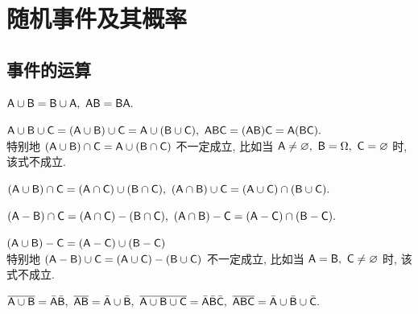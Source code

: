\section{随机事件及其概率}

\subsection{事件的运算}

\begin{theorem}[交换律]
    $\mathsf{A} \cup \mathsf{B}=\mathsf{B} \cup \mathsf{A},~\mathsf{A} \mathsf{B}=\mathsf{B} \mathsf{A} .$
\end{theorem}

\begin{theorem}[结合律]
    $\mathsf{A} \cup \mathsf{B} \cup \mathsf{C}=(\mathsf{A} \cup \mathsf{B}) \cup \mathsf{C}=\mathsf{A} \cup(\mathsf{B} \cup \mathsf{C}),~\mathsf{A} \mathsf{B} \mathsf{C}=(\mathsf{A} \mathsf{B}) \mathsf{C}=\mathsf{A}(\mathsf{B} \mathsf{C}) .$\\
    特别地 $(\mathsf{A} \cup \mathsf{B}) \cap \mathsf{C}=\mathsf{A} \cup(\mathsf{B} \cap \mathsf{C})$ 不一定成立, 比如当 $ \mathsf{A} \neq \varnothing,~\mathsf{B}=\Omega,~\mathsf{C}=\varnothing $ 时, 该式不成立.
\end{theorem}

\begin{theorem}[和与积的分配律]
    $(\mathsf{A} \cup \mathsf{B}) \cap \mathsf{C}=(\mathsf{A} \cap \mathsf{C}) \cup(\mathsf{B} \cap \mathsf{C}),~(\mathsf{A} \cap \mathsf{B}) \cup \mathsf{C}=(\mathsf{A} \cup \mathsf{C}) \cap(\mathsf{B} \cup \mathsf{C}) .$
\end{theorem}

\begin{theorem}[差与积的分配律]
    $(\mathsf{A}-\mathsf{B}) \cap \mathsf{C}=(\mathsf{A} \cap \mathsf{C})-(\mathsf{B} \cap \mathsf{C}),~(\mathsf{A} \cap \mathsf{B})-\mathsf{C}=(\mathsf{A}-\mathsf{C}) \cap(\mathsf{B}-\mathsf{C}) .$
\end{theorem}

\begin{theorem}[和与差的分配律]
    $(\mathsf{A} \cup \mathsf{B})-\mathsf{C}=(\mathsf{A}-\mathsf{C}) \cup(\mathsf{B}-\mathsf{C})$\\
    特别地 $(\mathsf{A}-\mathsf{B}) \cup \mathsf{C}=(\mathsf{A} \cup \mathsf{C})-(\mathsf{B} \cup \mathsf{C})$ 不一定成立, 比如当 $ \mathsf{A}=\mathsf{B},~\mathsf{C} \neq \varnothing $ 时, 该式不成立.
\end{theorem}

\begin{theorem}[对偶律]
    $\overline{\mathsf{A} \cup \mathsf{B}}=\bar{\mathsf{A}} \bar{\mathsf{B}},~\overline{\mathsf{A} \mathsf{B}}=\bar{\mathsf{A}} \cup \bar{\mathsf{B}},~\overline{\mathsf{A} \cup \mathsf{B} \cup \mathsf{C}}=\bar{\mathsf{A}} \bar{\mathsf{B}} \bar{\mathsf{C}},~\overline{\mathsf{A} \mathsf{B} \mathsf{C}}=\bar{\mathsf{A}} \cup \bar{\mathsf{B}} \cup \bar{\mathsf{C}} .$
\end{theorem}

